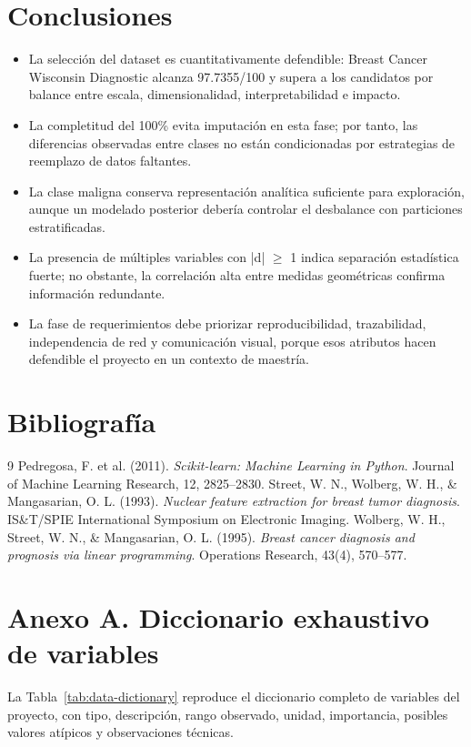 \documentclass[11pt,a4paper]{article}
\begin{document}
\section{Conclusiones}
\begin{itemize}
\item La selección del dataset es cuantitativamente defendible: Breast Cancer Wisconsin Diagnostic alcanza 97.7355/100 y supera a los candidatos por balance entre escala, dimensionalidad, interpretabilidad e impacto.
\item La completitud del 100\% evita imputación en esta fase; por tanto, las diferencias observadas entre clases no están condicionadas por estrategias de reemplazo de datos faltantes.
\item La clase maligna conserva representación analítica suficiente para exploración, aunque un modelado posterior debería controlar el desbalance con particiones estratificadas.
\item La presencia de múltiples variables con |d| $\geq$ 1 indica separación estadística fuerte; no obstante, la correlación alta entre medidas geométricas confirma información redundante.
\item La fase de requerimientos debe priorizar reproducibilidad, trazabilidad, independencia de red y comunicación visual, porque esos atributos hacen defendible el proyecto en un contexto de maestría.
\end{itemize}

\section{Bibliografía}
\begin{thebibliography}{9}
 Pedregosa, F. et al. (2011). \textit{Scikit-learn: Machine Learning in Python}. Journal of Machine Learning Research, 12, 2825--2830.
 Street, W. N., Wolberg, W. H., \& Mangasarian, O. L. (1993). \textit{Nuclear feature extraction for breast tumor diagnosis}. IS\&T/SPIE International Symposium on Electronic Imaging.
 Wolberg, W. H., Street, W. N., \& Mangasarian, O. L. (1995). \textit{Breast cancer diagnosis and prognosis via linear programming}. Operations Research, 43(4), 570--577.
\end{thebibliography}

\clearpage
\appendix
\section{Anexo A. Diccionario exhaustivo de variables}
La Tabla~\ref{tab:data-dictionary} reproduce el diccionario completo de variables del proyecto, con tipo, descripción, rango observado, unidad, importancia, posibles valores atípicos y observaciones técnicas.
\end{document}
